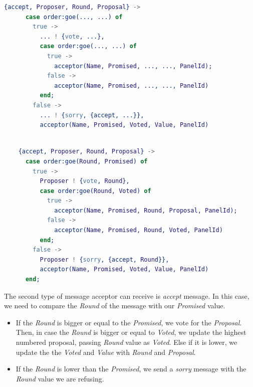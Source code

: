 \documentclass[a4paper, 10pt]{article}
\begin{document}
    \begin{minipage}{.45\textwidth}
	\begin{lstlisting}[language=erlang, caption={Template}]
    {accept, Proposer, Round, Proposal} ->
      case order:goe(..., ...) of
        true ->
          ... ! {vote, ...},
          case order:goe(..., ...) of
            true ->
              acceptor(Name, Promised, ..., ..., PanelId);
            false ->
              acceptor(Name, Promised, ..., ..., PanelId)
          end;                            
        false ->
          ... ! {sorry, {accept, ...}},
          acceptor(Name, Promised, Voted, Value, PanelId)
	\end{lstlisting}
    \end{minipage}\hfill
    \begin{minipage}{.45\textwidth}
	\begin{lstlisting}[language=erlang, caption={Filled version}]

    {accept, Proposer, Round, Proposal} ->
      case order:goe(Round, Promised) of
        true ->
          Proposer ! {vote, Round},
          case order:goe(Round, Voted) of
            true ->
              acceptor(Name, Promised, Round, Proposal, PanelId);
            false ->
              acceptor(Name, Promised, Round, Voted, PanelId)
          end;                            
        false ->
          Proposer ! {sorry, {accept, Round}},
          acceptor(Name, Promised, Voted, Value, PanelId)
      end;
  \end{lstlisting}
    \end{minipage}

The second type of message acceptor can receive is \textit{accept} message. In this case, we need to compare the \textit{Round} of the message with our \textit{Promised} value.

\begin{itemize}
  \item If the \textit{Round} is bigger or equal to the \textit{Promised}, we vote for the \textit{Proposal}. Then, in case the \textit{Round} is bigger or equal to \textit{Voted}, we update the highest numbered proposal, passing \textit{Round} value as \textit{Voted}. Else if it is lower, we update the the \textit{Voted} and \textit{Value} with \textit{Round} and \textit{Proposal}.
  \item If the \textit{Round} is lower than the \textit{Promised}, we send a \textit{sorry} message with the \textit{Round} value we are refusing.
\end{itemize}
\end{document}
